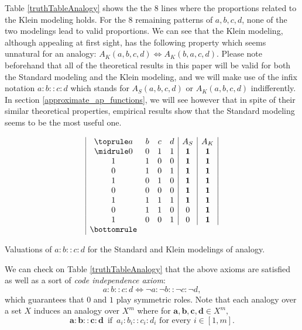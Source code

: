 \documentclass[article]{amsart}
\begin{document}
Table \ref{truthTableAnalogy} shows the the 8 lines where the proportions
related to the Klein modeling holds. For the 8 remaining patterns of $a, b, c,
d$, none of the two modelings lead to valid proportions. We can see
that the Klein modeling, although appealing at first sight, has the following
property which seems unnatural for an analogy: $A_K(a, b, c, d) \iff A_K(b, a,
c, d)$.  Please note beforehand that all of the theoretical results in this
paper will be valid for both the Standard modeling and the Klein modeling, and
we will make use of the infix notation $a:b::c:d$ which stands for $A_S(a, b,
c, d)$ or $A_K(a, b, c, d)$ indifferently. In section
\ref{approximate_ap_functions}, we will see however that in spite of their
similar theoretical properties, empirical results show that the Standard
modeling seems to be the most useful one.

\begin{table}[t]
\centering
  $$\begin{array}{|cccc|c|c|}
  \toprule
  a & b & c & d &  A_S & A_K \\
  \midrule
0 & 0 & 1 & 1 &   \textbf{1} &   \textbf{1} \\
1 & 1 & 0 & 0 &   \textbf{1} &   \textbf{1} \\
0 & 1 & 0 & 1 &   \textbf{1} &   \textbf{1}  \\
1 & 0 & 1 & 0 &   \textbf{1} &   \textbf{1} \\
0 & 0 & 0 & 0 &   \textbf{1} &   \textbf{1} \\
1 & 1 & 1 & 1 &   \textbf{1} &   \textbf{1} \\
0 & 1 & 1 & 0 &   0 &   \textbf{1} \\
1 & 0 & 0 & 1 &   0 &   \textbf{1} \\
\bottomrule
\end{array}
$$
  \caption{\small{Valuations of $a : b :: c : d$ for the Standard and Klein
  modelings of analogy}.}
\label{truthTableAnalogy}
\end{table}

We can check on Table \ref{truthTableAnalogy} that the above axioms are
satisfied as well as a sort of {\it code independence axiom}:
$$a : b :: c : d \iff \neg a :  \neg b ::  \neg c :  \neg d,$$
which guarantees that $0$ and $1$ play symmetric roles.  Note that each analogy
over a set $X$ induces an analogy over $X^m$ where for $\mathbf{a}, \mathbf{b},
\mathbf{c}, \mathbf{d} \in X^m,$
$$  \mathbf{a}: \mathbf{b}:: \mathbf{c}: \mathbf{d} \, \text{ if } \,
a_i :  b_i ::  c_i :  d_i \text{ for every } i\in [1,m].$$ 
\end{document}
